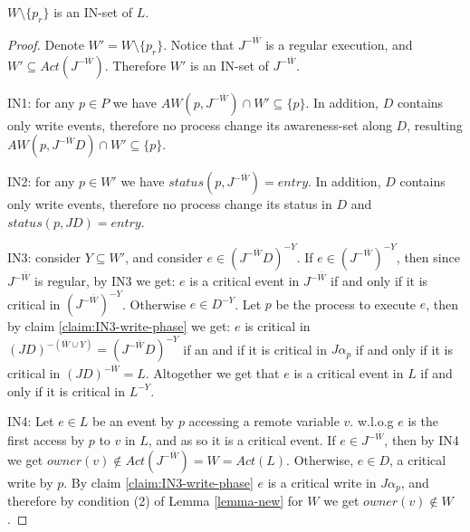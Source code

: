 \begin{claim-subsection}
	$W \setminus \{p_r\}$ is an IN-set of $L$.
\end{claim-subsection}

\begin{proof}
	Denote $W' = W \setminus \{p_r\}$. Notice that $J^{-\overline{W}}$ is a regular execution, and $W' \subseteq Act(J^{-\overline{W}})$. Therefore $W'$ is an IN-set of $J^{-\overline{W}}$.
	
	IN1: for any $p \in P$ we have $AW(p,J^{-\overline{W}}) \cap W' \subseteq \{p\}$. In addition, $D$ contains only write events, therefore no process change its awareness-set along $D$, resulting $AW(p,J^{-\overline{W}} D) \cap W' \subseteq \{p\}$.
	
	IN2: for any $p \in W'$ we have $status(p,J^{-\overline{W}}) = entry$.  In addition, $D$ contains only write events, therefore no process change its status in $D$ and $status(p,J D) = entry$.
	
	IN3: consider $Y \subseteq W'$, and consider $e \in (J^{-\overline{W}} D)^{-Y}$. If $e \in (J^{-\overline{W}})^{-Y}$, then since $J^{-\overline{W}}$ is regular, by IN3 we get: $e$ is a critical event in $J^{-\overline{W}}$ if and only if it is critical in $(J^{-\overline{W}})^{-Y}$. Otherwise $e \in D^{-Y}$. Let $p$ be the process to execute $e$, then by claim \ref{claim:IN3-write-phase} we get: $e$ is critical in $(J D)^{-(\overline{W} \cup Y)} = (J^{-\overline{W}} D)^{-Y}$ if an and if it is critical in $J \alpha_p$ if and only if it is critical in $(J D)^{-\overline{W}} = L$.
	Altogether we get that $e$ is a critical event in $L$ if and only if it is critical in $L^{-Y}$.
	
	IN4: Let $e \in L$ be an event by $p$ accessing a remote variable $v$. w.l.o.g $e$ is the first access by $p$ to $v$ in $L$, and as so it is a critical event. If $e \in J^{-\overline{W}}$, then by IN4 we get $owner(v) \notin Act(J^{-\overline{W}}) = W =Act(L)$. Otherwise, $e \in D$, a critical write by $p$. By claim \ref{claim:IN3-write-phase} $e$ is a critical write in $J \alpha_p$, and therefore by condition (2) of Lemma \ref{lemma-new} for $W$ we get $owner(v) \notin W$.
	

\end{proof}
